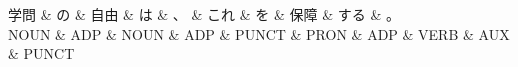 \documentclass[tikz,border=5pt]{standalone}
\begin{document}
\normalsize
\begin{dependency}[edge unit distance=12.0pt]
    \begin{deptext}[column sep=1em]
        学問 \& の \& 自由 \& は \& 、 \& これ \& を \& 保障 \& する \& 。\\
        NOUN \& ADP \& NOUN \& ADP \& PUNCT \& PRON \& ADP \& VERB \& AUX \& PUNCT\\
    \end{deptext}
\end{dependency}
\end{document}
